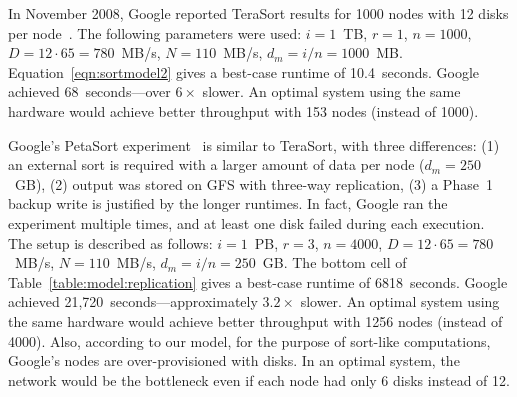 In November 2008,
Google reported TeraSort results for 1000 nodes with
12 disks per node~\cite{sorting1pb}. The following parameters were
used: $i = 1$~TB, $r = 1$, $n = 1000$, $D = 12 \cdot 65 = 780$~MB/s,
$N = 110$~MB/s, $d_m = i/n = 1000$~MB.
Equation~\ref{eqn:sortmodel2} gives a best-case runtime of 10.4~seconds.
Google achieved
68~seconds---over $6\times$ slower.
An optimal system using the same hardware would achieve better
throughput with 153 nodes (instead of 1000).

Google's PetaSort experiment~\cite{sorting1pb} is similar to TeraSort,
with three differences:
(1) an external sort is required with a larger
amount of data per node ($d_m = 250$~GB),
(2) output was stored on GFS with three-way replication,
(3) a Phase~1 backup write is justified by the longer runtimes.
In fact, Google ran the experiment multiple times, and at least one disk
failed during each execution.
The setup is described as follows:
$i = 1$~PB, $r = 3$, $n = 4000$, $D = 12 \cdot 65 = 780$~MB/s,
$N = 110$~MB/s, $d_m = i/n = 250$~GB.
The bottom cell of Table~\ref{table:model:replication} gives
a best-case runtime of 6818~seconds.
Google achieved
21,720~seconds---approximately $3.2\times$ slower.
An optimal system using the same hardware would
achieve better throughput with 1256 nodes (instead of 4000).
Also, according to our model, for the purpose of sort-like
computations, Google's nodes are over-provisioned with disks. In an optimal
system, the network would be the bottleneck even if each node had only 6
disks instead of 12.

